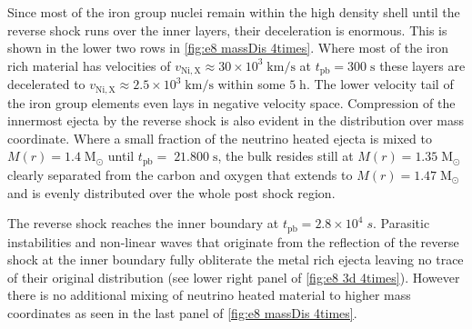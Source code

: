 \documentclass[fleqn,usenatbib]{mnras}
\newcommand{\tpb}{\ensuremath{t_\mathrm{pb}}}
\begin{document}
Since most of the iron group nuclei remain within the high density shell until the reverse shock runs over the inner layers, their deceleration is enormous. This is shown in the lower two rows in \autoref{fig:e8 massDis 4times}. Where most of the iron rich material has velocities of $v_{\mathrm{Ni,X}}\approx 30\times10^3 \;\mathrm{km/s}$ at $t_{\mathrm{pb}}=300\;\mathrm{s}$ these layers are decelerated to $v_{\mathrm{Ni,X}}\approx 2.5\times 10^3\;\mathrm{km/s}$ within some $5 \;\mathrm{h}$. The lower velocity tail of the iron group elements even lays in negative velocity space. 
Compression of the innermost ejecta by the reverse shock is also evident in the distribution over mass coordinate. Where a small fraction of the neutrino heated ejecta is mixed to $M(r)=1.4\;\mathrm{M_{\odot}}$ until $t_{\mathrm{pb}}=\;21.800\;\mathrm{s}$, the bulk resides still at  $M(r)=1.35\;\mathrm{M_{\odot}}$ clearly separated from the carbon and oxygen that extends to $M(r)=1.47\;\mathrm{M_{\odot}}$ and is evenly distributed over the whole post shock region.

The reverse shock reaches the inner boundary at $\tpb=2.8\times 10^4\;s$. Parasitic instabilities and non-linear waves that originate from the reflection of the reverse shock at the inner boundary fully obliterate the metal rich ejecta leaving no trace of their original distribution (see lower right panel of \autoref{fig:e8 3d 4times}). However there is no additional mixing of neutrino heated material to higher mass coordinates as seen in the last panel of \autoref{fig:e8 massDis 4times}.
\end{document}

